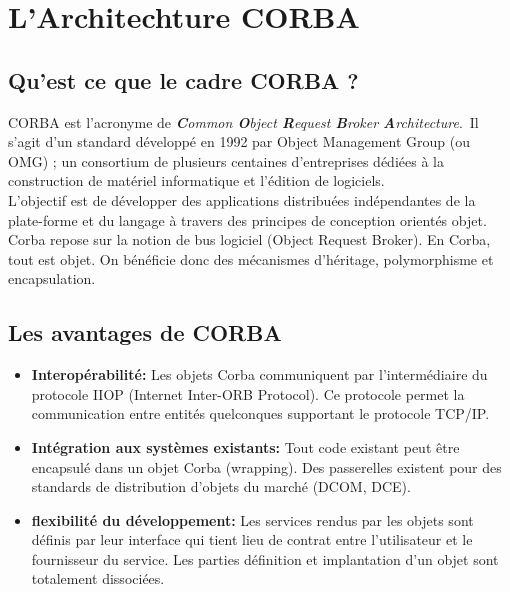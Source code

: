 \chapter{L'Architechture CORBA}

    \section{Qu'est ce que le cadre CORBA ?}

        \par CORBA est l’acronyme de \textit{\textbf{C}ommon \textbf{O}bject \textbf{R}equest \textbf{B}roker \textbf{A}rchitecture}. Il s’agit d’un standard développé en 1992 par Object Management Group (ou OMG) ; un consortium de plusieurs centaines d’entreprises dédiées à la construction de matériel informatique et l’édition de logiciels.\\
        L’objectif est de développer des applications distribuées indépendantes de la plate-forme et du langage à travers des principes de conception orientés objet.\\

        Corba repose sur la notion de bus logiciel (Object Request Broker).
        En Corba, tout est objet. On bénéficie donc des mécanismes d'héritage, polymorphisme et encapsulation.

    \section{Les avantages de CORBA}

        \begin{itemize}[label= ]
            \item \textbf{Interopérabilité: }Les objets Corba communiquent par l'intermédiaire du protocole IIOP (Internet Inter-ORB Protocol). Ce protocole permet la communication entre entités quelconques supportant le protocole TCP/IP.
            \item \textbf{Intégration aux systèmes existants: }Tout code existant peut être encapsulé dans un objet Corba (wrapping). Des passerelles existent pour des standards de distribution d'objets du marché (DCOM, DCE).
            \item \textbf{flexibilité du développement: }Les services rendus par les objets sont définis par leur interface qui tient lieu de contrat entre l'utilisateur et le fournisseur du service. Les parties définition et implantation d'un objet sont totalement dissociées.
        \end{itemize}

